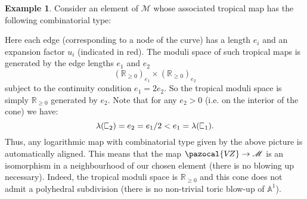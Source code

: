 \documentclass[11pt]{amsart}
\newcommand{\sqC}{\scalebox{0.8}[1.3]{$\sqsubset$}}
\newcommand{\PP}{\mathbb P}
\newcommand{\VZ}{\pazocal{V\!Z}}
\renewcommand{\to}{\rightarrow}
\newcommand{\Aaff}{\mathbb{A}}
\newcommand{\Mcal}{\mathcal{M}}
\newcommand{\RR}{\mathbb{R}}
\theoremstyle{definition}
\theoremstyle{definition}
\newtheorem{example}[thm]{Example}
\begin{document}
\begin{example} Consider an element of $\Mcal$ whose associated tropical map has the following combinatorial type:
\begin{center}
\end{center}
Here each edge (corresponding to a node of the curve) has a length $e_i$ and an expansion factor $u_i$ (indicated in red). The moduli space of such tropical maps is generated by the edge lengths $e_1$ and $e_2$
\begin{equation*} (\RR_{\geq 0})_{e_1} \times (\RR_{\geq 0})_{e_2} \end{equation*}
subject to the continuity condition $e_1=2e_2$. So the tropical moduli space is simply $\RR_{\geq 0}$ generated by $e_2$. Note that for any $e_2 > 0$ (i.e. on the interior of the cone) we have:
\begin{equation*} \lambda(\sqC_2) = e_2 = e_1/2 < e_1 = \lambda(\sqC_1). \end{equation*}
Thus, any logarithmic map with combinatorial type given by the above picture is automatically aligned. This means that the map $\VZ \to \Mcal$ is an isomorphism in a neighbourhood of our chosen element (there is no blowing up necessary). Indeed, the tropical moduli space is $\RR_{\geq 0}$ and this cone does not admit a polyhedral subdivision (there is no non-trivial toric blow-up of $\Aaff^1$).
\end{example}
\end{document}
